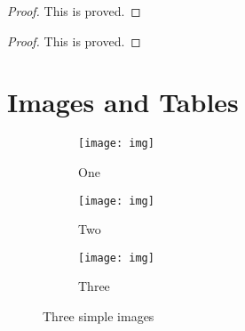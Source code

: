 \documentclass{report}
\theoremstyle{definition}
\theoremstyle{remark}
\begin{document}
\renewcommand\qedsymbol{$\blacksquare$}

\begin{proof}
This is proved.
\end{proof}

\renewcommand\qedsymbol{QED}

\begin{proof}
This is proved.
\end{proof}

\chapter{Images and Tables}

\begin{figure}[!h]
     \centering
     \begin{subfigure}[b]{0.3\textwidth}
         \centering
         \texttt{[image: img]}
         \caption{One}
         \label{fig:onesub}
     \end{subfigure}
     \hfill
     \begin{subfigure}[b]{0.3\textwidth}
         \centering
         \texttt{[image: img]}
         \caption{Two}
         \label{fig:twosub}
     \end{subfigure}
     \hfill
     \begin{subfigure}[b]{0.3\textwidth}
         \centering
         \texttt{[image: img]}
         \caption{Three}
         \label{fig:threesub}
     \end{subfigure}
        \caption{Three simple images}
        \label{fig:three imgs}
\end{figure}
\end{document}

